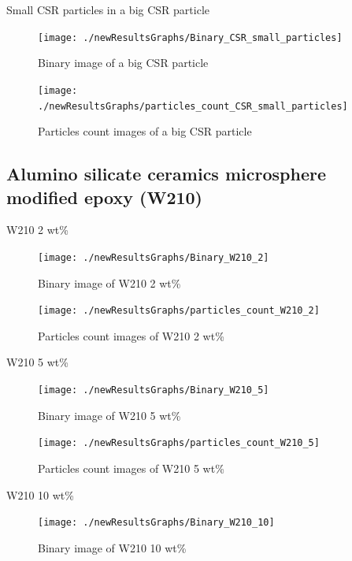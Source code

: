 \documentclass[numbers=noendperiod,chapterprefix=on]{icldt} %
\begin{document}
\newpage
Small CSR particles in a big CSR particle

\begin{figure}[!hp]
\centering
\texttt{[image: ./newResultsGraphs/Binary\_CSR\_small\_particles]}
\caption{Binary image of a big CSR particle} \label{Binary_CSR_small_particles}
\end{figure}
\FloatBarrier

\begin{figure}[!hp]
\centering
\texttt{[image: ./newResultsGraphs/particles\_count\_CSR\_small\_particles]}
\caption{Particles count images of a big CSR particle} \label{particles_count_CSR_small_particles}
\end{figure}
\FloatBarrier

\subsection{Alumino silicate ceramics microsphere modified epoxy (W210)}
W210 2 wt\%

\begin{figure}[!hp]
\centering
\texttt{[image: ./newResultsGraphs/Binary\_W210\_2]}
\caption{Binary image of W210 2 wt\%} \label{Binary_W210_2}
\end{figure}
\FloatBarrier

\begin{figure}[!hp]
\centering
\texttt{[image: ./newResultsGraphs/particles\_count\_W210\_2]}
\caption{Particles count images of W210 2 wt\%} \label{particles_count_W210_2}
\end{figure}
\FloatBarrier

W210 5 wt\%

\begin{figure}[!hp]
\centering
\texttt{[image: ./newResultsGraphs/Binary\_W210\_5]}
\caption{Binary image of W210 5 wt\%} \label{Binary_W210_5}
\end{figure}
\FloatBarrier

\begin{figure}[!hp]
\centering
\texttt{[image: ./newResultsGraphs/particles\_count\_W210\_5]}
\caption{Particles count images of W210 5 wt\%} \label{particles_count_W210_5}
\end{figure}
\FloatBarrier

W210 10 wt\%

\begin{figure}[!hp]
\centering
\texttt{[image: ./newResultsGraphs/Binary\_W210\_10]}
\caption{Binary image of W210 10 wt\%} \label{Binary_W210_10}
\end{figure}
\FloatBarrier
\end{document}
